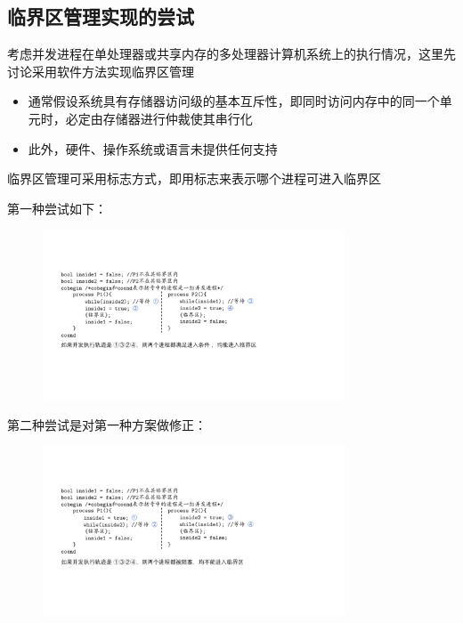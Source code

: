 \documentclass[cs4size,a4paper,10pt]{ctexart}
\begin{document}
	\subsection{临界区管理实现的尝试}
	
	考虑并发进程在单处理器或共享内存的多处理器计算机系统上的执行情况，这里先讨论采用软件方法实现临界区管理
	\begin{itemize}
		\item 通常假设系统具有存储器访问级的基本互斥性，即同时访问内存中的同一个单元时，必定由存储器进行仲裁使其串行化
		\item 此外，硬件、操作系统或语言未提供任何支持
	\end{itemize}

	临界区管理可采用标志方式，即用标志来表示哪个进程可进入临界区
	
	第一种尝试如下：
	\begin{figure}[H]
		\centering
		\includegraphics[width=0.8\textwidth]{img/临界区管理尝试1.pdf}
	\end{figure}

	第二种尝试是对第一种方案做修正：
	\begin{figure}[H]
		\centering
		\includegraphics[width=0.8\textwidth]{img/临界区管理尝试2.pdf}
	\end{figure}
\end{document}
